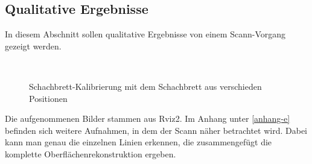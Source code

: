 		\newpage
		
		
	\subsection{Qualitative Ergebnisse}\label{chap:qual_ergeb}
	
	In diesem Abschnitt sollen qualitative Ergebnisse von einem Scann-Vorgang gezeigt werden.
	
	\begin{figure}[h]
		\centering
		 \\
		\caption[Qualitative Ergebnisse]{Schachbrett-Kalibrierung mit dem Schachbrett aus verschieden Positionen}
		\label{fig:scan_imgs}
	\end{figure}
	Die aufgenommenen Bilder stammen aus Rviz2. Im Anhang unter \ref{anhang-e} befinden sich weitere Aufnahmen, in dem der Scann näher betrachtet wird. Dabei kann man genau die einzelnen Linien erkennen, die zusammengefügt die komplette Oberflächenrekonstruktion ergeben. 
	\newpage
	
